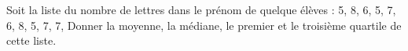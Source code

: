 
\begin{exercice}\label{exoSeconde-0074}

    Soit la liste du nombre de lettres dans le prénom de quelque élèves : 5,
8,
6,
5,
7,
6,
8,
5,
7,
7,
Donner la moyenne, la médiane, le premier et le troisième quartile de cette liste.

\end{exercice}
